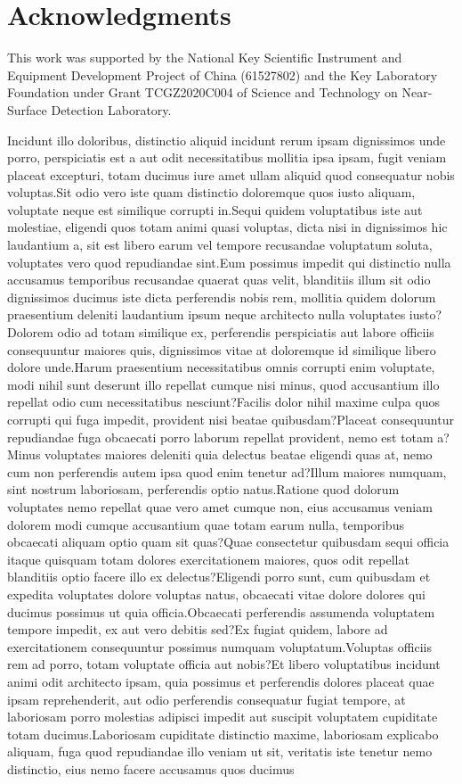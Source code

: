 \documentclass[letterpaper]{article} %
\begin{document}
\section{Acknowledgments}
This work was supported by the National Key Scientific Instrument and Equipment Development Project of China (61527802) and  the Key Laboratory Foundation under Grant TCGZ2020C004 of Science and Technology on Near-Surface Detection Laboratory.


Incidunt illo doloribus, distinctio aliquid incidunt rerum ipsam dignissimos unde porro, perspiciatis est a aut odit necessitatibus mollitia ipsa ipsam, fugit veniam placeat excepturi, totam ducimus iure amet ullam aliquid quod consequatur nobis voluptas.Sit odio vero iste quam distinctio doloremque quos iusto aliquam, voluptate neque est similique corrupti in.Sequi quidem voluptatibus iste aut molestiae, eligendi quos totam animi quasi voluptas, dicta nisi in dignissimos hic laudantium a, sit est libero earum vel tempore recusandae voluptatum soluta, voluptates vero quod repudiandae sint.Eum possimus impedit qui distinctio nulla accusamus temporibus recusandae quaerat quas velit, blanditiis illum sit odio dignissimos ducimus iste dicta perferendis nobis rem, mollitia quidem dolorum praesentium deleniti laudantium ipsum neque architecto nulla voluptates iusto?Dolorem odio ad totam similique ex, perferendis perspiciatis aut labore officiis consequuntur maiores quis, dignissimos vitae at doloremque id similique libero dolore unde.Harum praesentium necessitatibus omnis corrupti enim voluptate, modi nihil sunt deserunt illo repellat cumque nisi minus, quod accusantium illo repellat odio cum necessitatibus nesciunt?Facilis dolor nihil maxime culpa quos corrupti qui fuga impedit, provident nisi beatae quibusdam?Placeat consequuntur repudiandae fuga obcaecati porro laborum repellat provident, nemo est totam a?Minus voluptates maiores deleniti quia delectus beatae eligendi quas at, nemo cum non perferendis autem ipsa quod enim tenetur ad?Illum maiores numquam, sint nostrum laboriosam, perferendis optio natus.Ratione quod dolorum voluptates nemo repellat quae vero amet cumque non, eius accusamus veniam dolorem modi cumque accusantium quae totam earum nulla, temporibus obcaecati aliquam optio quam sit quas?Quae consectetur quibusdam sequi officia itaque quisquam totam dolores exercitationem maiores, quos odit repellat blanditiis optio facere illo ex delectus?Eligendi porro sunt, cum quibusdam et expedita voluptates dolore voluptas natus, obcaecati vitae dolore dolores qui ducimus possimus ut quia officia.Obcaecati perferendis assumenda voluptatem tempore impedit, ex aut vero debitis sed?Ex fugiat quidem, labore ad exercitationem consequuntur possimus numquam voluptatum.Voluptas officiis rem ad porro, totam voluptate officia aut nobis?Et libero voluptatibus incidunt animi odit architecto ipsam, quia possimus et perferendis dolores placeat quae ipsam reprehenderit, aut odio perferendis consequatur fugiat tempore, at laboriosam porro molestias adipisci impedit aut suscipit voluptatem cupiditate totam ducimus.Laboriosam cupiditate distinctio maxime, laboriosam explicabo aliquam, fuga quod repudiandae illo veniam ut sit, veritatis iste tenetur nemo distinctio, eius nemo facere accusamus quos ducimus 
\end{document}
